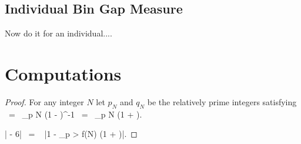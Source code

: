 \documentclass[12pt,reqno]{amsart} %
\begin{document}

\subsection{Individual Bin Gap Measure}

Now do it for an individual....

\newpage

\appendix


\section{Computations}

\begin{proof} For any integer $N$ let $p_N$ and $q_N$ be the
relatively prime integers satisfying
\be
{} \ = \ \prod_{p \le N} \left(1 -
\right)^{-1} \ = \ \prod_{p \le N} \left(1 + \right).
\ee

\lipsum[10]

\be \left| - 6\right| \ = \ 
\left|1 - \prod_{p > f(N)} \left(1 + \right)\right|.
\ee

\end{proof}


\medskip

\renewcommand{\mkbibnamefamily}[1]{\textsc{#1}} %
\printbibliography
\end{document}

